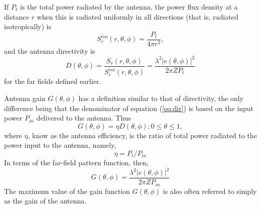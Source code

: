If $P_t$ is the total power radiated by the antenna, the power flux density at a distance $r$ when this is radiated uniformly in all directions (that is, radiated isotropically) is
\begin{equation}
S_r^{iso}(r,\theta,\phi)=\frac{P_t}{4\pi r^2},
\end{equation}
and the antenna directivity is
\begin{equation}
D(\theta,\phi)=\dfrac{S_r(r,\theta,\phi)}{S_r^{iso}(r,\theta,\phi)}=\dfrac{\lambda^2|e(\theta,\phi)|^2}{2\pi ZP_t}
\label{eq:dirdetial}
\end{equation}
for the far fields defined earlier.

Antenna gain $G(\theta,\phi)$ has a definition similar to that of directivity, the only difference being that the denominator of equation (\ref{eq:dir}) is based on the input power $P_{in}$ delivered to the antenna. Thus
\begin{equation}
G(\theta,\phi)=\eta D(\theta,\phi) ; 0\leqslant \theta \leqslant 1,
\end{equation}
where $\eta$, know as the antenna efficiency, is the ratio of total power radiated to the power input to the antenna, namely,
\begin{equation}
\eta = P_t/P_{in}
\end{equation}
In terms of the far-field pattern function, then,
\begin{equation}
G(\theta,\phi)=\dfrac{\lambda^2|e(\theta,\phi)|^2}{2\pi ZP_{in}}
\label{eq:gain}
\end{equation}
The maximum value of the gain function $G(\theta,\phi)$ is also often referred to simply as the gain of the antenna.

